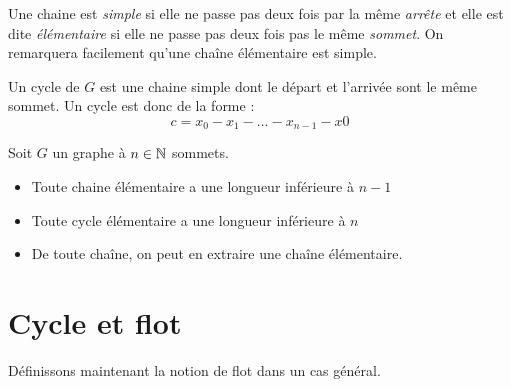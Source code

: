 \begin{definition}
    Une chaine est \emph{simple} si elle ne passe pas deux fois par la même \emph{arrête} et elle est dite \emph{élémentaire} 
    si elle ne passe pas deux fois pas le même \emph{sommet}.
    On remarquera facilement qu'une chaîne élémentaire est simple.
\end{definition}

\begin{definition}[Cycle]
    Un cycle de $G$ est une chaine simple dont le départ et l'arrivée sont le même sommet. Un cycle est donc de la forme :
        \[ c = x_0 - x_1 - \dots - x_{n-1} - x0 \] 
\end{definition}

\begin{theorem}
    Soit $G$ un graphe à $ n \in \mathbb{N}$ sommets. 
    \begin{itemize}
        \item Toute chaine élémentaire a une longueur inférieure à $n-1$
        \item Toute cycle élémentaire a une longueur inférieure à $n$
        \item De toute chaîne, on peut en extraire une chaîne élémentaire.
    \end{itemize}
\end{theorem}


\section{Cycle et flot}

Définissons maintenant la notion de flot dans un cas général. 


